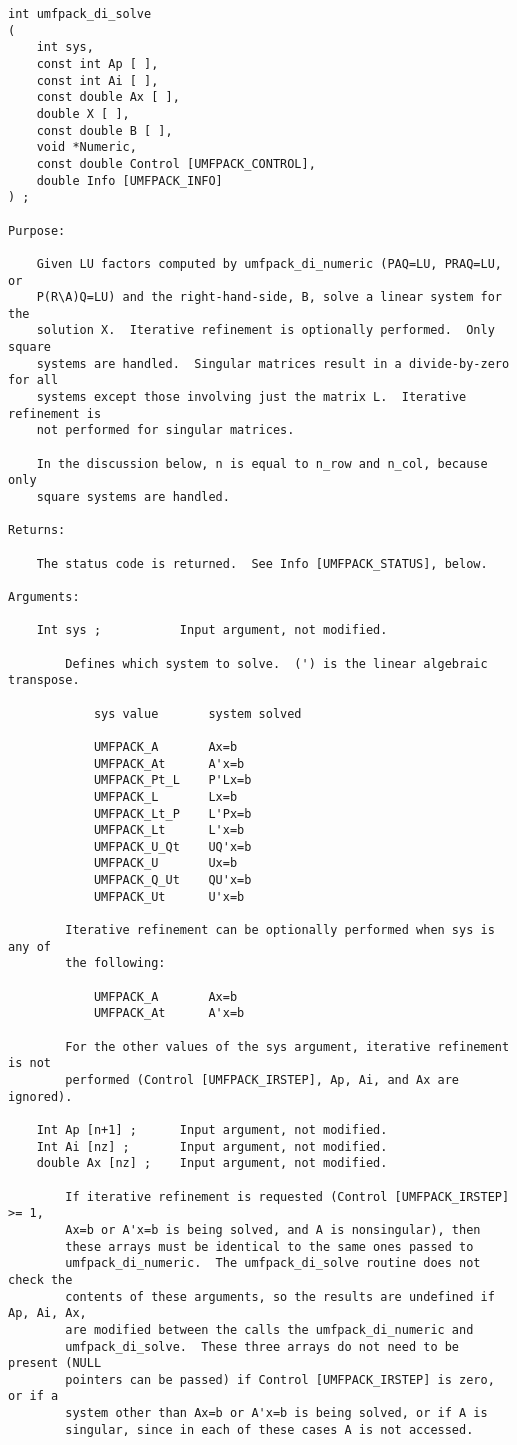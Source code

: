 \documentclass[11pt]{article}
\begin{document}
{\footnotesize
\begin{verbatim}
int umfpack_di_solve
(
    int sys,
    const int Ap [ ],
    const int Ai [ ],
    const double Ax [ ],
    double X [ ],
    const double B [ ],
    void *Numeric,
    const double Control [UMFPACK_CONTROL],
    double Info [UMFPACK_INFO]
) ;

Purpose:

    Given LU factors computed by umfpack_di_numeric (PAQ=LU, PRAQ=LU, or
    P(R\A)Q=LU) and the right-hand-side, B, solve a linear system for the
    solution X.  Iterative refinement is optionally performed.  Only square
    systems are handled.  Singular matrices result in a divide-by-zero for all
    systems except those involving just the matrix L.  Iterative refinement is
    not performed for singular matrices.

    In the discussion below, n is equal to n_row and n_col, because only
    square systems are handled.

Returns:

    The status code is returned.  See Info [UMFPACK_STATUS], below.

Arguments:

    Int sys ;           Input argument, not modified.

        Defines which system to solve.  (') is the linear algebraic transpose.

            sys value       system solved

            UMFPACK_A       Ax=b
            UMFPACK_At      A'x=b
            UMFPACK_Pt_L    P'Lx=b
            UMFPACK_L       Lx=b
            UMFPACK_Lt_P    L'Px=b
            UMFPACK_Lt      L'x=b
            UMFPACK_U_Qt    UQ'x=b
            UMFPACK_U       Ux=b
            UMFPACK_Q_Ut    QU'x=b
            UMFPACK_Ut      U'x=b

        Iterative refinement can be optionally performed when sys is any of
        the following:

            UMFPACK_A       Ax=b
            UMFPACK_At      A'x=b

        For the other values of the sys argument, iterative refinement is not
        performed (Control [UMFPACK_IRSTEP], Ap, Ai, and Ax are ignored).

    Int Ap [n+1] ;      Input argument, not modified.
    Int Ai [nz] ;       Input argument, not modified.
    double Ax [nz] ;    Input argument, not modified.

        If iterative refinement is requested (Control [UMFPACK_IRSTEP] >= 1,
        Ax=b or A'x=b is being solved, and A is nonsingular), then
        these arrays must be identical to the same ones passed to
        umfpack_di_numeric.  The umfpack_di_solve routine does not check the
        contents of these arguments, so the results are undefined if Ap, Ai, Ax,
        are modified between the calls the umfpack_di_numeric and
        umfpack_di_solve.  These three arrays do not need to be present (NULL
        pointers can be passed) if Control [UMFPACK_IRSTEP] is zero, or if a
        system other than Ax=b or A'x=b is being solved, or if A is
        singular, since in each of these cases A is not accessed.


\end{verbatim}}
\end{document}
